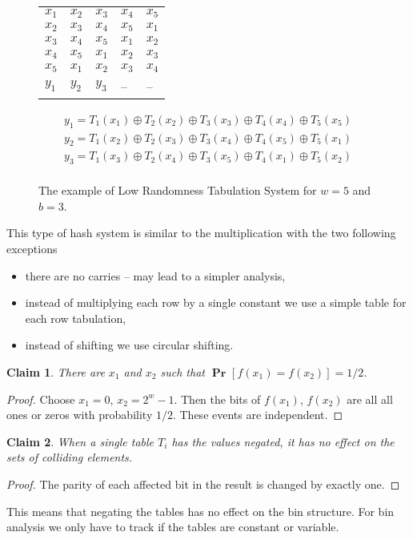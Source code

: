 \documentclass{article}
\newcommand{\probs}[2]{\operatorname{\mathbf{Pr}}_{{#1}}\left[{#2}\right]}
\newcommand{\prob}[1]{\probs{}{#1}}
\newtheorem{claim}{Claim}
\begin{document}
\begin{figure}[ht]
\caption{The example of Low Randomness Tabulation System for $w = 5$ and $b = 3$.}
\begin{center} 
\begin{tabular}{l l l | l l}
$x_1$ & $x_2$ & $x_3$ & $x_4$ & $x_5$ \\
$x_2$ & $x_3$ & $x_4$ & $x_5$ & $x_1$ \\
$x_3$ & $x_4$ & $x_5$ & $x_1$ & $x_2$ \\
$x_4$ & $x_5$ & $x_1$ & $x_2$ & $x_3$ \\
$x_5$ & $x_1$ & $x_2$ & $x_3$ & $x_4$ \\
\hline
$y_1$ & $y_2$ & $y_3$ & -- &  --
\end{tabular}
\end{center}

\begin{align*}
y_1 = T_1(x_1) \oplus T_2(x_2) \oplus T_3(x_3) \oplus T_4(x_4) \oplus T_5(x_5) \\
y_2 = T_1(x_2) \oplus T_2(x_3) \oplus T_3(x_4) \oplus T_4(x_5) \oplus T_5(x_1) \\
y_3 = T_1(x_3) \oplus T_2(x_4) \oplus T_3(x_5) \oplus T_4(x_1) \oplus T_5(x_2) \\
\end{align*}
\end{figure}

This type of hash system is similar to the multiplication with the two following exceptions
\begin{itemize}
	\item there are no carries -- may lead to a simpler analysis,
	\item instead of multiplying each row by a single constant we use a simple table for each row tabulation,
	\item instead of shifting we use circular shifting.
\end{itemize}

\begin{claim}
\label{claim-lrts-universality}
 There are $x_1$ and $x_2$ such that $\prob{f(x_1) = f(x_2)} = 1/2$.
\end{claim}
\begin{proof}
Choose $x_1 = 0$, $x_2 = 2^w - 1$. Then the bits of $f(x_1)$, $f(x_2)$ are all all ones or zeros with probability $1/2$. These events are independent.
\end{proof}

\begin{claim}
When a single table $T_i$ has the values negated, it has no effect on the sets of colliding elements.
\end{claim}
\begin{proof}
The parity of each affected bit in the result is changed by exactly one.
\end{proof}
This means that negating the tables has no effect on the bin structure.
For bin analysis we only have to track if the tables are constant or variable.
\end{document}
